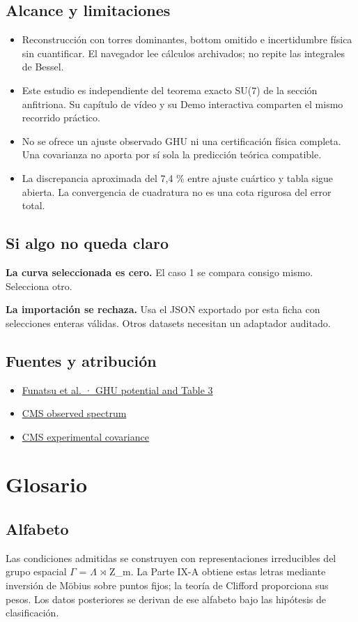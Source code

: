 \documentclass[11pt,a4paper]{article}
\begin{document}
\subsection*{Alcance y limitaciones}
\begin{itemize}
\item Reconstrucción con torres dominantes, bottom omitido e incertidumbre física sin cuantificar. El navegador lee cálculos archivados; no repite las integrales de Bessel.
\item Este estudio es independiente del teorema exacto SU(7) de la sección anfitriona. Su capítulo de vídeo y su Demo interactiva comparten el mismo recorrido práctico.
\item No se ofrece un ajuste observado GHU ni una certificación física completa. Una covarianza no aporta por sí sola la predicción teórica compatible.
\item La discrepancia aproximada del 7,4 \% entre ajuste cuártico y tabla sigue abierta. La convergencia de cuadratura no es una cota rigurosa del error total.
\end{itemize}
\subsection*{Si algo no queda claro}
\textbf{La curva seleccionada es cero.} El caso 1 se compara consigo mismo. Selecciona otro.

\textbf{La importación se rechaza.} Usa el JSON exportado por esta ficha con selecciones enteras válidas. Otros datasets necesitan un adaptador auditado.

\subsection*{Fuentes y atribución}
\begin{itemize}
\item \href{https://arxiv.org/html/2002.09262v3}{Funatsu et al. · GHU potential and Table 3}
\item \href{https://doi.org/10.17182/hepdata.102956.v1/t37}{CMS observed spectrum}
\item \href{https://doi.org/10.17182/hepdata.102956.v1/t38}{CMS experimental covariance}
\end{itemize}
\section{Glosario}
\subsection*{Alfabeto}
Las condiciones admitidas se construyen con representaciones irreducibles del grupo espacial \ensuremath{\Gamma} = \ensuremath{\Lambda} \ensuremath{\rtimes} Z\_m. La Parte IX-A obtiene estas letras mediante inversión de Möbius sobre puntos fijos; la teoría de Clifford proporciona sus pesos. Los datos posteriores se derivan de ese alfabeto bajo las hipótesis de clasificación.
\end{document}
